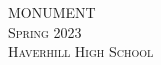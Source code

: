 \begin{titlingpage*}
    \centering
    {\HUGE MONUMENT}\\[\baselineskip]
    {\Large\textsc{Spring 2023}}\\
    \vspace*{\fill}
    {\large\textsc{Haverhill High School}}
    \titlingpageend{\clearpage}{\clearpage}
\end{titlingpage*}